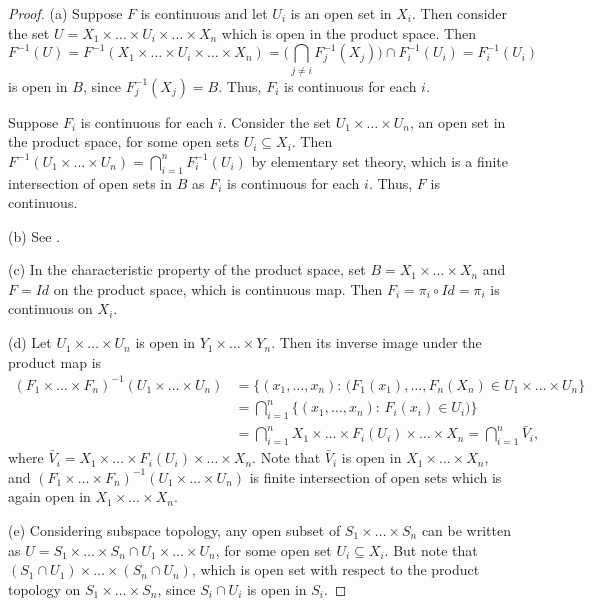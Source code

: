 \documentclass[11pt,a4paper]{article}
\begin{document}
\begin{proof}
(a) \forward Suppose $F$ is continuous and let $U_i$ is an open set in $X_i$. Then consider the set $U = X_1\times\ldots\times U_i\times\ldots\times X_n$ which is open in the product space. Then $$F^{-1}(U) = F^{-1}(X_1\times\ldots\times U_i\times\ldots\times X_n) = \Big(\bigcap_{j\neq i} F_j^{-1}(X_j)\Big)\cap F_i^{-1}(U_i) = F_i^{-1}(U_i) $$ is open in $B$, since $F_j^{-1}(X_j) = B$. Thus, $F_i$ is continuous for each $i$. 

\noindent\converse Suppose $F_i$ is continuous for each $i$. Consider the set $U_1\times\ldots\times U_n$, an open set in the product space, for some open sets $U_i\subseteq X_i$. Then $F^{-1}(U_1\times\ldots\times U_n) = \bigcap_{i = 1}^n F^{-1}_i(U_i)$ by elementary set theory, which is a finite intersection of open sets in $B$ as $F_i$ is continuous for each $i$. Thus, $F$ is continuous.

\noindent(b) See \cite[Thm. 3.30]{JohnLee}.

\noindent(c) In the characteristic property of the product space, set $B = X_1\times\ldots\times X_n$ and $F = Id$ on the product space, which is continuous map. Then $F_i = \pi_i\circ Id = \pi_i$ is continuous on $X_i$.

\noindent(d) Let $U_1\times\ldots\times U_n$ is open in $Y_1\times\ldots\times Y_n$. Then its inverse image under the product map is 
\begin{align*}
(F_1\times \ldots\times F_n)^{-1}(U_1\times \ldots\times U_n) 
&= \{(x_1,\ldots,x_n):\,(F_1(x_1),\ldots,F_n(X_n)\in U_1\times \ldots\times U_n\} \\
&= \bigcap_{i=1}^n\{(x_1,\ldots,x_n):\,F_i(x_i)\in U_i)\} \\
&= \bigcap_{i=1}^n X_1\times\ldots\times F_i(U_i)\times\ldots\times X_n = \bigcap_{i=1}^n \bar{V}_i, 
\end{align*}
where $\bar{V}_i = X_1\times\ldots\times F_i(U_i)\times\ldots\times X_n$. Note that $\bar{V}_i$ is open in $X_1\times \ldots\times X_n$, and $(F_1\times \ldots\times F_n)^{-1}(U_1\times \ldots\times U_n)$ is finite intersection of open sets which is again open in $X_1\times \ldots\times X_n$.

\noindent(e) Considering subspace topology, any open subset of $S_1\times\ldots\times S_n$ can be written as $U = S_1\times\ldots\times S_n\cap U_1\times\ldots\times U_n$, for some open set $U_i\subseteq X_i$. But note that $(S_1\cap U_1)\times\ldots\times (S_n\cap U_n)$, which is open set with respect to the product topology on $S_1\times\ldots\times S_n$, since $S_i\cap U_i$ is open in $S_i$.


\end{proof}
\end{document}
